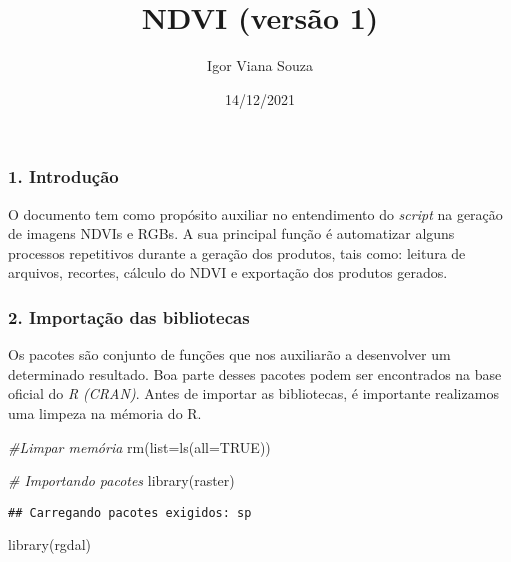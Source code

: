 \documentclass[
]{article}
\title{NDVI (versão 1)}
\author{Igor Viana Souza}
\date{14/12/2021}
\newenvironment{Shaded}{\begin{snugshade}}{\end{snugshade}}
\newcommand{\AttributeTok}[1]{\textcolor[rgb]{0.77,0.63,0.00}{#1}}
\newcommand{\CommentTok}[1]{\textcolor[rgb]{0.56,0.35,0.01}{\textit{#1}}}
\newcommand{\ConstantTok}[1]{\textcolor[rgb]{0.00,0.00,0.00}{#1}}
\newcommand{\FunctionTok}[1]{\textcolor[rgb]{0.00,0.00,0.00}{#1}}
\newcommand{\NormalTok}[1]{#1}
\begin{document}
\maketitle

\hypertarget{introduuxe7uxe3o}{%
\subsubsection{1. Introdução}\label{introduuxe7uxe3o}}

O documento tem como propósito auxiliar no entendimento do \emph{script}
na geração de imagens NDVIs e RGBs. A sua principal função é automatizar
alguns processos repetitivos durante a geração dos produtos, tais como:
leitura de arquivos, recortes, cálculo do NDVI e exportação dos produtos
gerados.

\hypertarget{importauxe7uxe3o-das-bibliotecas}{%
\subsubsection{2. Importação das
bibliotecas}\label{importauxe7uxe3o-das-bibliotecas}}

Os pacotes são conjunto de funções que nos auxiliarão a desenvolver um
determinado resultado. Boa parte desses pacotes podem ser encontrados na
base oficial do \emph{R (CRAN)}. Antes de importar as bibliotecas, é
importante realizamos uma limpeza na mémoria do R.

\begin{Shaded}
\begin{Highlighting}[]
\CommentTok{\#Limpar memória}
\FunctionTok{rm}\NormalTok{(}\AttributeTok{list=}\FunctionTok{ls}\NormalTok{(}\AttributeTok{all=}\ConstantTok{TRUE}\NormalTok{))}
\end{Highlighting}
\end{Shaded}

\begin{Shaded}
\begin{Highlighting}[]
\CommentTok{\# Importando pacotes}
\FunctionTok{library}\NormalTok{(raster)}
\end{Highlighting}
\end{Shaded}

\begin{verbatim}
## Carregando pacotes exigidos: sp
\end{verbatim}

\begin{Shaded}
\begin{Highlighting}[]
\FunctionTok{library}\NormalTok{(rgdal)}
\end{Highlighting}
\end{Shaded}
\end{document}
